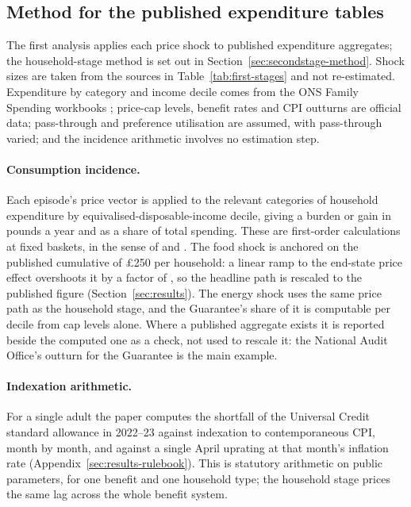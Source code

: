 \subsection{Method for the published expenditure tables}\label{sec:method}

The first analysis applies each price shock to published expenditure
aggregates; the household-stage method is set out in
Section~\ref{sec:secondstage-method}. Shock sizes are taken from the
sources in Table~\ref{tab:first-stages} and not re-estimated.
Expenditure by category and income decile comes from the ONS Family
Spending workbooks \citep{onsfamilyspending, onsfamilyspending2026}; price-cap levels, benefit
rates and CPI outturns are official data; pass-through and preference
utilisation are assumed, with pass-through varied; and the incidence
arithmetic involves no estimation step.

\paragraph{Consumption incidence.} Each episode's price vector is
applied to the relevant categories of household expenditure by
equivalised-disposable-income decile, giving a burden or gain in
pounds a year and as a share of total spending. These are first-order
calculations at fixed baskets, in the sense of \citet{deaton1989} and
\citet{porto2006}. The food shock is anchored on the published
cumulative of \pounds 250 per household: a linear ramp to the
end-state price effect overshoots it by a factor of
\MsTcaCrossCheckRatio, so the headline path is rescaled to the
published figure (Section~\ref{sec:results}). The energy shock uses
the same price path as the household stage, and the Guarantee's share
of it is computable per decile from cap levels alone. Where a
published aggregate exists it is reported beside the computed one as a
check, not used to rescale it: the National Audit Office's outturn for
the Guarantee is the main example.

\paragraph{Indexation arithmetic.} For a single adult the paper
computes the shortfall of the Universal Credit standard allowance in
2022--23 against indexation to contemporaneous CPI, month by month,
and against a single April uprating at that month's inflation rate
(Appendix~\ref{sec:results-rulebook}). This is statutory arithmetic on
public parameters, for one benefit and one household type; the
household stage prices the same lag across the whole benefit system.


